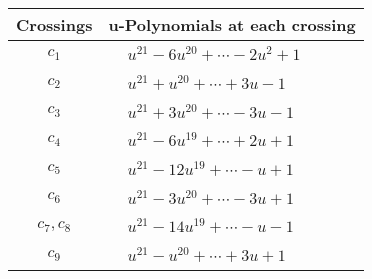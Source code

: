\documentclass[1p]{elsarticle_modified}
\theoremstyle{definition}
\begin{document}
\begin{tabular}{m{50pt}|m{274pt}}
Crossings & \hspace{64pt}u-Polynomials at each crossing \\
\hline $$\begin{aligned}c_{1}\end{aligned}$$&$\begin{aligned}
&u^{21}-6 u^{20}+\cdots-2 u^2+1
\end{aligned}$\\
\hline $$\begin{aligned}c_{2}\end{aligned}$$&$\begin{aligned}
&u^{21}+u^{20}+\cdots+3 u-1
\end{aligned}$\\
\hline $$\begin{aligned}c_{3}\end{aligned}$$&$\begin{aligned}
&u^{21}+3 u^{20}+\cdots-3 u-1
\end{aligned}$\\
\hline $$\begin{aligned}c_{4}\end{aligned}$$&$\begin{aligned}
&u^{21}-6 u^{19}+\cdots+2 u+1
\end{aligned}$\\
\hline $$\begin{aligned}c_{5}\end{aligned}$$&$\begin{aligned}
&u^{21}-12 u^{19}+\cdots- u+1
\end{aligned}$\\
\hline $$\begin{aligned}c_{6}\end{aligned}$$&$\begin{aligned}
&u^{21}-3 u^{20}+\cdots-3 u+1
\end{aligned}$\\
\hline $$\begin{aligned}c_{7},c_{8}\end{aligned}$$&$\begin{aligned}
&u^{21}-14 u^{19}+\cdots- u-1
\end{aligned}$\\
\hline $$\begin{aligned}c_{9}\end{aligned}$$&$\begin{aligned}
&u^{21}- u^{20}+\cdots+3 u+1
\end{aligned}$\\

\end{tabular}
\end{document}

